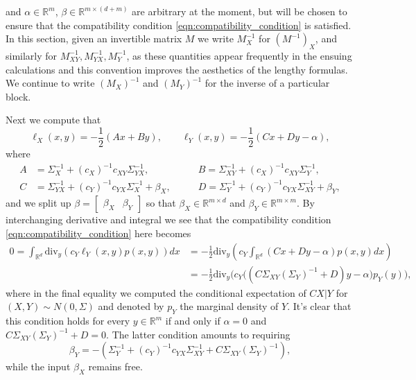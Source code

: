 \documentclass{article}
\theoremstyle{plain}
\theoremstyle{definition}
\newcommand{\R}{\mathbb{R}}
\numberwithin{lem}{section}
\begin{document}
and $\alpha \in \R^m$, $\beta \in \R^{m\times (d+m)}$ are arbitrary at the moment, but will be chosen to ensure that the compatibility condition \eqref{eqn:compatibility_condition} is satisfied. In this section, given an invertible matrix $M$ we write $M^{-1}_X$ for $(M^{-1})_X$, and similarly for $M^{-1}_{XY},M^{-1}_{YX},M^{-1}_Y$, as these quantities appear frequently in the ensuing calculations and this convention improves the aesthetics of the lengthy formulas. We continue to write $(M_X)^{-1}$ and $(M_Y)^{-1}$ for the inverse of a particular block. 

Next we compute that
\[\ell_X(x,y) = -\frac{1}{2}(Ax + By), \qquad \ell_Y(x,y) = -\frac{1}{2}(Cx + Dy - \alpha),\]
where
\begin{align}
    A & = \Sigma^{-1}_X + (c_X)^{-1}c_{XY}\Sigma^{-1}_{YX}, \qquad & B  = \Sigma^{-1}_{XY} + (c_X)^{-1}c_{XY}\Sigma^{-1}_Y, \\
    C & = \Sigma^{-1}_{YX}+(c_Y)^{-1}c_{YX}\Sigma^{-1}_X+\beta_X, \qquad & D = \Sigma^{-1}_Y + (c_Y)^{-1}c_{YX}\Sigma^{-1}_{XY} + \beta_Y, 
\end{align}
and we split up $\beta = \begin{bmatrix} \beta_X & \beta_Y \end{bmatrix}$ so that $\beta_X \in \R^{m\times d}$ and $\beta_Y \in \R^{m \times m}$. By interchanging derivative and integral we see that the compatibility condition \eqref{eqn:compatibility_condition} here becomes 
\begin{align}
    0 = \int_{\R^d}\mathrm{div}_y(c_Y\ell_Y(x,y)p(x,y))dx & = -\frac{1}{2} \mathrm{div}_y\left(c_Y\int_{\R^d}(Cx + Dy -\alpha)p(x,y)dx\right) \\
    & = -\frac{1}{2}\mathrm{div}_y\Big(c_Y\big((C\Sigma_{XY}(\Sigma_Y)^{-1}+D)y - \alpha\big)p_Y(y)\Big),
\end{align}
where in the final equality we computed the conditional expectation of $CX|Y$ for $(X,Y) \sim N(0,\Sigma)$ and denoted by $p_Y$ the marginal density of $Y$.
It's clear that this condition holds for every $y \in \R^m$ if and only if $\alpha = 0$ and $C\Sigma_{XY}(\Sigma_Y)^{-1} +D = 0$. The latter condition amounts to requiring
\begin{equation} \label{eqn:beta_Y}
\beta_Y = -(\Sigma^{-1}_Y + (c_Y)^{-1}c_{YX}\Sigma^{-1}_{XY} + C\Sigma_{XY}(\Sigma_Y)^{-1}), 
\end{equation}
while the input $\beta_X$ remains free.
\end{document}
